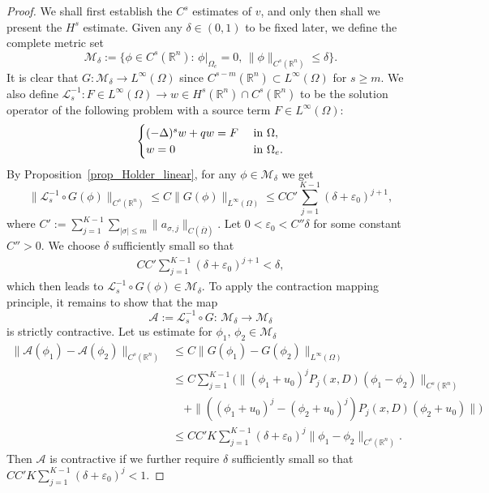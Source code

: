 \documentclass [oneside,11pt] {amsart}
\numberwithin{equation}{section}
\newcommand{\R}{\mathbb{R}}
\begin{document}
\begin{proof}
We shall first establish the $C^s$ estimates of $v$, and only then shall we present the $H^s$ estimate. Given any $\delta\in (0,1)$ to be fixed later, we define the complete metric set
\[
\mathcal{M}_\delta := \{\phi \in C^{s}(\R^n):\, \phi|_{\Omega_e} = 0,\, \|\phi\|_{C^{s}(\R^n)}\le \delta\}.
\]
It is clear that $G:\mathcal{M}_\delta\rightarrow L^\infty(\Omega)$ since $C^{s-m}(\R^n)\subset L^\infty(\Omega)$ for $s\ge m$. We also define $\mathcal{L}_s^{-1}: F\in L^\infty(\Omega)\to w\in H^s(\R^n)\cap C^{s}(\R^n)$ to be the solution operator of the following problem with a source term $F\in L^\infty(\Omega)$:
\begin{equation}\label{eq_wellpose_pf_linear_source}
\begin{cases}
(-\Delta)^{s}w + qw= F&\hbox{ in } \Omega,\\
w = 0 & \hbox{ in } \Omega_e.
\end{cases}
\end{equation}
By Proposition~\ref{prop_Holder_linear}, for any $\phi\in\mathcal{M}_\delta$ we get
$$
\|\mathcal{L}_s^{-1}\circ G(\phi)\|_{C^{s}(\R^n)}\leq C\| G(\phi)\|_{L^\infty(\Omega)}\leq C C' \sum^{K-1}_{j=1}(\delta+\varepsilon_0)^{j+1},
$$
where $C':=\sum^{K-1}_{j=1} \sum_{|\sigma|\leq m}\|a_{\sigma,j}\|_{C(\overline\Omega)}$.
Let $0<\varepsilon_0<C''\delta$ for some constant $C''>0$. We choose $\delta$ sufficiently small so that
\begin{align}\label{contrative estimate}
C C'\sum^{K-1}_{j=1}(\delta+\varepsilon_0)^{j+1} <\delta,
\end{align}
which then leads to $\mathcal{L}_s^{-1}\circ G(\phi) \in \mathcal{M}_\delta$. To apply the contraction mapping principle, it remains to show that the map
\[
\mathcal{A}:= \mathcal{L}_s^{-1}\circ G:\, \mathcal{M}_\delta \to \mathcal{M}_\delta
\]
is strictly contractive. Let us estimate for $\phi_1,\,\phi_2\in \mathcal{M}_\delta$
\begin{align*}
\|\mathcal{A}(\phi_1)-\mathcal{A}(\phi_2)\|_{C^{s}(\R^n)} 
&\le C\|G(\phi_1)-G(\phi_2)\|_{L^\infty(\Omega)} \\
&\le C\sum_{j = 1}^{K-1} \Big(\|(\phi_1+u_0)^jP_j(x,D)(\phi_1-\phi_2)\|_{C^{s}(\R^n)}\\
&\quad + \|\left((\phi_1+u_0)^j-(\phi_2+u_0)^j\right)P_j(x,D)(\phi_2+u_0)\|\Big)\\
&\leq CC'K\sum^{K-1}_{j=1}(\delta+\varepsilon_0)^{j} \|\phi_1-\phi_2\|_{C^{s}(\R^n)}. 
\end{align*} 
Then $\mathcal{A}$ is contractive if we further require $\delta$ sufficiently small so that $CC'K\sum^{K-1}_{j=1}(\delta+\varepsilon_0)^{j} <1$.

\end{proof}
\end{document}
